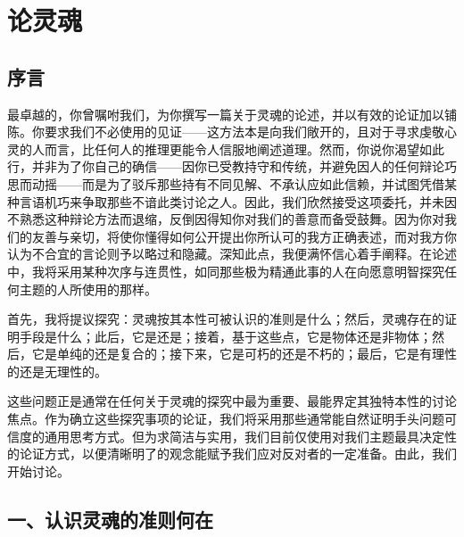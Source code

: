 
\chapter{论灵魂}



\section{序言}

最卓越的，你曾嘱咐我们，为你撰写一篇关于灵魂的论述，并以有效的论证加以铺陈。你要求我们不必使用的见证——这方法本是向我们敞开的，且对于寻求虔敬心灵的人而言，比任何人的推理更能令人信服地阐述道理。然而，你说你渴望如此行，并非为了你自己的确信——因你已受教持守和传统，并避免因人的任何辩论巧思而动摇——而是为了驳斥那些持有不同见解、不承认应如此信赖，并试图凭借某种言语机巧来争取那些不谙此类讨论之人。因此，我们欣然接受这项委托，并未因不熟悉这种辩论方法而退缩，反倒因得知你对我们的善意而备受鼓舞。因为你对我们的友善与亲切，将使你懂得如何公开提出你所认可的我方正确表述，而对我方你认为不合宜的言论则予以略过和隐藏。深知此点，我便满怀信心着手阐释。在论述中，我将采用某种次序与连贯性，如同那些极为精通此事的人在向愿意明智探究任何主题的人所使用的那样。\par

首先，我将提议探究：灵魂按其本性可被认识的准则是什么；然后，灵魂存在的证明手段是什么；此后，它是还是；接着，基于这些点，它是物体还是非物体；然后，它是单纯的还是复合的；接下来，它是可朽的还是不朽的；最后，它是有理性的还是无理性的。\par

这些问题正是通常在任何关于灵魂的探究中最为重要、最能界定其独特本性的讨论焦点。作为确立这些探究事项的论证，我们将采用那些通常能自然证明手头问题可信度的通用思考方式。但为求简洁与实用，我们目前仅使用对我们主题最具决定性的论证方式，以便清晰明了的观念能赋予我们应对反对者的一定准备。由此，我们开始讨论。\par


\section{一、认识灵魂的准则何在}

